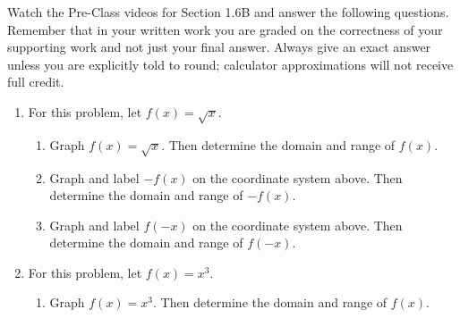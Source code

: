 


\noindent Watch the Pre-Class videos for Section 1.6B and answer the following questions. Remember that in your written work you are graded on the correctness of your supporting work and not just your final answer. Always give an exact answer unless you are explicitly told to round; calculator approximations will not receive full credit. 

\begin{enumerate}

\item  For this problem, let $f(x)=\sqrt{x}$.

\begin{enumerate}
\item Graph $f(x)=\sqrt{x}$.  Then determine the domain and range of $f(x)$.\\

\vfill



\item Graph and label $-f(x)$ on the coordinate system above.  Then determine the domain and range of $-f(x)$.
\vfill
\vfill

\item Graph and label $f(-x)$ on the coordinate system above.  Then determine the domain and range of $f(-x)$.

\end{enumerate}
\vfill
\vfill

\newpage

\item  For this problem, let $f(x)=x^3$.
\begin{enumerate}
\item Graph $f(x)=x^3$.  Then determine the domain and range of $f(x)$.\\
\end{enumerate}
\end{enumerate}
